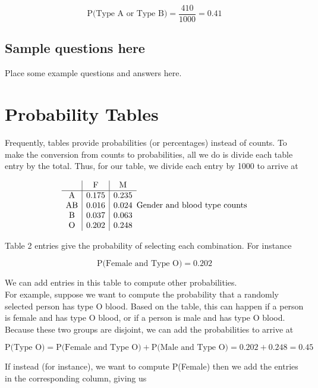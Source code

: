 \documentclass[
]{book}
\begin{document}
\[
\mbox{P(Type A or Type B)} = \frac{410}{1000} = 0.41
\]

\hypertarget{sample-questions-here-1}{%
\subsection{Sample questions here}\label{sample-questions-here-1}}

Place some example questions and answers here.

\hypertarget{probability-tables}{%
\section{Probability Tables}\label{probability-tables}}

Frequently, tables provide probabilities (or percentages) instead of counts.
To make the conversion from counts to probabilities, all we do is divide each table entry by the total.
Thus, for our table, we divide each entry by 1000 to arrive at

\[
\begin{array}{c|c|c}
           & \mathrm{F} & \mathrm{M}\\ \hline
\mathrm{A} & 0.175 & 0.235 \\ 
\mathrm{AB} & 0.016 & 0.024 \\ 
\mathrm{B} & 0.037 & 0.063 \\ 
\mathrm{O} & 0.202 & 0.248 \\ 
\end{array}\\
\mbox{Gender and blood type counts}
\]

Table 2 entries give the probability of selecting each combination. For instance

\[
\mbox{P(Female and Type O)} = 0.202
\]

We can add entries in this table to compute other probabilities.\\
For example, suppose we want to compute the probability that a randomly selected person has type O blood.
Based on the table, this can happen if a person is female and has type O blood, or if a person is male and has type O blood.
Because these two groups are disjoint, we can add the probabilities to arrive at

\[
\mbox{P(Type O)} = \mbox{P(Female and Type O)} + \mbox{P(Male and Type O)}
= 0.202 + 0.248 = 0.45
\]

If instead (for instance), we want to compute P(Female) then we add the entries in the corresponding column, giving us
\end{document}
